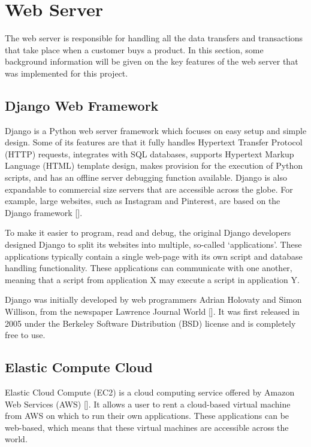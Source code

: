 \section{Web Server}

The web server is responsible for handling all the data transfers and transactions that
take place when a customer buys a product. In this section, some background information
will be given on the key features of the web server that was implemented for this project.

\subsection{Django Web Framework}
\label{sec:django}

Django is a Python web server framework which focuses on easy setup and simple design.
Some of its features are that it fully handles Hypertext Transfer Protocol (HTTP)
requests, integrates with SQL databases, supports Hypertext Markup Language (HTML)
template design, makes provision for the execution of Python scripts, and has an offline
server debugging function available. Django is also expandable to commercial size
servers that are accessible across the globe. For example, large websites, such as
Instagram and Pinterest, are based on the Django framework [\cite{website:django-sites}].

To make it easier to program, read and debug, the original Django developers
designed Django to split its websites into multiple, so-called `applications'.
These applications typically contain a single web-page with its own script and
database handling functionality. These applications can communicate with one
another, meaning that a script from application X may execute a script in application Y.

Django was initially developed by web programmers Adrian Holovaty and Simon Willison, from the
newspaper Lawrence Journal World [\cite{website:django-exist}]. It was first released in 2005
under the Berkeley Software Distribution (BSD) license and is completely free to use.

\subsection{Elastic Compute Cloud}
\label{sec:ec2}

Elastic Cloud Compute (EC2) is a cloud computing service offered by Amazon Web
Services (AWS) [\cite{website:aws}]. It allows a user to rent a cloud-based
virtual machine from AWS on which to run their own applications. These applications can be
web-based, which means that these virtual machines are accessible across the world.

